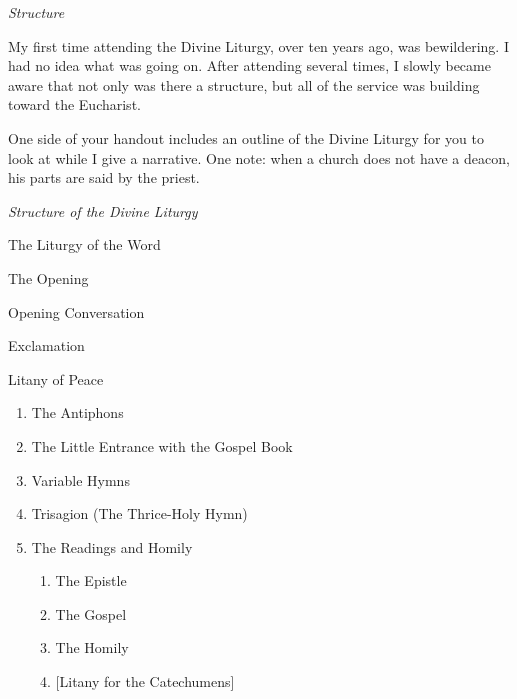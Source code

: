 \documentclass[
]{article}
\begin{document}
\emph{Structure}

My first time attending the Divine Liturgy, over ten years ago, was
bewildering. I had no idea what was going on. After attending several
times, I slowly became aware that not only was there a structure, but
all of the service was building toward the Eucharist.

One side of your handout includes an outline of the Divine Liturgy for
you to look at while I give a narrative. One note: when a church does
not have a deacon, his parts are said by the priest.

\emph{Structure of the Divine Liturgy}

The Liturgy of the Word

The Opening

Opening Conversation

Exclamation

Litany of Peace

\begin{enumerate}
\def\labelenumi{\arabic{enumi}.}
\item
  The Antiphons
\item
  The Little Entrance with the Gospel Book
\item
  Variable Hymns
\item
  Trisagion (The Thrice-Holy Hymn)
\item
  The Readings and Homily

  \begin{enumerate}
  \def\labelenumii{\arabic{enumii}.}
  \item
    The Epistle
  \item
    The Gospel
  \item
    The Homily
  \item
    {[}Litany for the Catechumens{]}
  \end{enumerate}
\end{enumerate}
\end{document}
